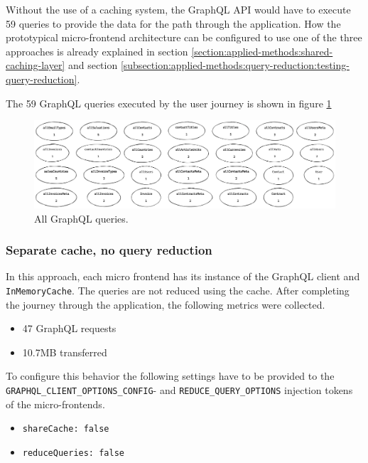 \noindent Without the use of a caching system, the GraphQL \ac{API} would have to execute 59 queries to provide the data for the path through the application. How the prototypical micro-frontend architecture can be configured to use one of the three approaches is already explained in section \ref{section:applied-methods:shared-caching-layer} and section \ref{subsection:applied-methods:query-reduction:testing-query-reduction}. 

The 59 GraphQL queries executed by the user journey is shown in figure \ref{fig:results:graphql-queries}

\ifshowImages
\begin{figure}[H]
\centering
\includegraphics[width=1\linewidth]{images/results/graphql-queries.png}
\caption{All GraphQL queries.}\label{fig:results:graphql-queries}
\end{figure}
\fi

\subsubsection{Separate cache, no query reduction}

In this approach, each micro frontend has its instance of the GraphQL client and \texttt{InMemoryCache}. The queries are not reduced using the cache. After completing the journey through the application, the following metrics were collected.

\begin{itemize}
  \item 47 GraphQL requests
  \item 10.7MB transferred
\end{itemize}

To configure this behavior the following settings have to be provided to the \texttt{GRAPHQL\_CLIENT\_OPTIONS\_CONFIG}- and \texttt{REDUCE\_QUERY\_OPTIONS} injection tokens of the micro-frontends.

\begin{itemize}
  \item \texttt{shareCache: false}
  \item \texttt{reduceQueries: false}
\end{itemize}

